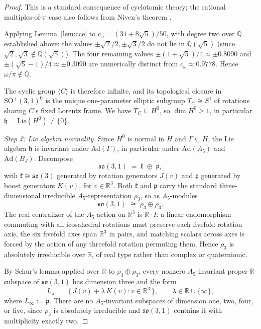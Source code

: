 \documentclass[11pt]{article}
\theoremstyle{remark}
\begin{document}
\begin{proof}
This is a standard consequence of cyclotomic theory; the rational
multiples-of-$\pi$ case also follows from Niven's theorem
\cite{Niven}.

Applying Lemma~\ref{lem:cce} to $c_\omega = (31 + 8\sqrt{5})/50$,
with degree two over $\mathbb{Q}$ established above: the values
$\pm\sqrt{2}/2, \pm\sqrt{3}/2$ do not lie in $\mathbb{Q}(\sqrt{5})$
(since $\sqrt{2}, \sqrt{3} \notin \mathbb{Q}(\sqrt{5})$). The four
remaining values $\pm(1+\sqrt{5})/4 \approx \pm 0.8090$ and
$\pm(\sqrt{5}-1)/4 \approx \pm 0.3090$ are numerically distinct from
$c_\omega \approx 0.9778$. Hence $\omega/\pi \notin \mathbb{Q}$.

The cyclic group $\langle C\rangle$ is therefore infinite, and its
topological closure in $\mathrm{SO}^+(3,1)^0$ is the unique
one-parameter elliptic subgroup $T_C \cong S^1$ of rotations sharing
$C$'s fixed Lorentz frame. We have $T_C \subseteq H^0$, so
$\dim H^0 \geq 1$, in particular $\mathfrak{h} = \mathrm{Lie}(H^0) \neq
\{0\}$.

\emph{Step 2: Lie algebra normality.}
Since $H^0$ is normal in $H$ and $\Gamma \subseteq H$, the Lie
algebra $\mathfrak{h}$ is invariant under $\mathrm{Ad}(\Gamma)$, in
particular under $\mathrm{Ad}(A_5)$ and $\mathrm{Ad}(B_J)$. Decompose
\[
  \mathfrak{so}(3,1) \;=\; \mathfrak{k} \;\oplus\; \mathfrak{p},
\]
with $\mathfrak{k} \cong \mathfrak{so}(3)$ generated by rotation
generators $J(v)$ and $\mathfrak{p}$ generated by boost generators
$K(v)$, for $v \in \mathbb{R}^3$. Both $\mathfrak{k}$ and
$\mathfrak{p}$ carry the standard three-dimensional irreducible
$A_5$-representation $\rho_3$, so as $A_5$-modules
\[
  \mathfrak{so}(3,1) \;\cong\; \rho_3 \oplus \rho_3.
\]
The real centralizer of the $A_5$-action on $\mathbb{R}^3$ is
$\mathbb{R} \cdot I$: a linear endomorphism commuting with all
icosahedral rotations must preserve each fivefold rotation axis, the
six fivefold axes span $\mathbb{R}^3$ in pairs, and matching scalars
across axes is forced by the action of any threefold rotation
permuting them. Hence $\rho_3$ is absolutely irreducible over
$\mathbb{R}$, of real type rather than complex or quaternionic.

By Schur's lemma applied over $\mathbb{R}$ to $\rho_3 \oplus \rho_3$,
every nonzero $A_5$-invariant proper $\mathbb{R}$-subspace of
$\mathfrak{so}(3,1)$ has dimension three and the form
\[
  L_\lambda \;=\; \bigl\{\, J(v) + \lambda\, K(v) : v \in
  \mathbb{R}^3 \,\bigr\}, \qquad \lambda \in \mathbb{R} \cup
  \{\infty\},
\]
where $L_\infty := \mathfrak{p}$. There are no $A_5$-invariant
subspaces of dimension one, two, four, or five, since $\rho_3$ is
absolutely irreducible and $\mathfrak{so}(3,1)$ contains it with
multiplicity exactly two.


\end{proof}
\end{document}
